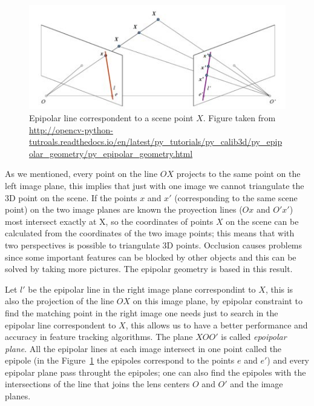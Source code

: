 \begin{figure}[h!]
\centering
\includegraphics[width = 1\textwidth]{./Diagrams/epipolar_line.jpg}
\caption{Epipolar line correspondent to a scene point $X$. Figure taken from \url{http://opencv-python-tutroals.readthedocs.io/en/latest/py_tutorials/py_calib3d/py_epipolar_geometry/py_epipolar_geometry.html}}
\label{epipolar_line}
\end{figure}

As we mentioned, every point on the line $OX$ projects to the same point on the left image plane, this implies that just with one image we cannot triangulate the 3D point on the scene. If the points $x$ and $x'$ (corresponding to the same scene point) on the two image planes are known the proyection lines ($Ox$ and $O'x'$) most intersect exactly at X, so the coordinates of points $X$ on the scene can be calculated from the coordinates of the two image points; this means that with two perspectives is possible to triangulate 3D points. Occlusion causes problems since some important features can be blocked by other objects and this can be solved by taking more pictures. The epipolar geometry is based in this result. 

\bigskip

Let $l'$ be the epipolar line in the right image plane correspondint to $X$, this is also the projection of the line $OX$ on this image plane, by epipolar constraint to find the matching point in the right image one needs just to search in the epipolar line correspondent to $X$, this allows us to have a better performance and accuracy in feature tracking algorithms. The plane $XOO'$ is called \textit{epoipolar plane}. All the epipolar lines at each image intersect in one point called the epipole (in the Figure~\ref{epipolar_line} the epipoles correspond to the points $e$ and $e'$) and every epipolar plane pass throught the epipoles; one can also find the epipoles with the intersections of the line that joins the lens centers $O$ and $O'$ and the image planes.

